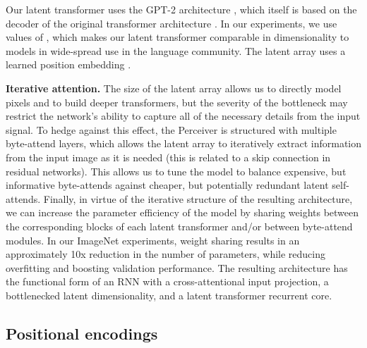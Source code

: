 \documentclass{article}
\begin{document}
Our latent transformer uses the GPT-2 architecture \cite{radford2019language}, which itself is based on the decoder of the original transformer architecture \cite{vaswani2017attention}. In our experiments, we use values of , which makes our latent transformer comparable in dimensionality to models in wide-spread use in the language community. The latent array uses a learned position embedding \cite{gehring2017convolutional}.

\noindent \textbf{Iterative attention.}
The size of the latent array allows us to directly model pixels and to build deeper transformers, but the severity of the bottleneck may restrict the network's ability to capture all of the necessary details from the input signal. To hedge against this effect, the Perceiver is structured with multiple byte-attend layers, which allows the latent array to iteratively extract information from the input image as it is needed (this is related to a skip connection in residual networks). This allows us to tune the model to balance expensive, but informative byte-attends against cheaper, but potentially redundant latent self-attends. Finally, in virtue of the iterative structure of the resulting architecture, we can increase the parameter efficiency of the model by sharing weights between the corresponding blocks of each latent transformer and/or between byte-attend modules. In our ImageNet experiments, weight sharing results in an approximately 10x reduction in the number of parameters, while reducing overfitting and boosting validation performance. The resulting architecture has the functional form of an RNN with a cross-attentional input projection, a bottlenecked latent dimensionality, and a latent transformer recurrent core.

\subsection{Positional encodings}
\end{document}
